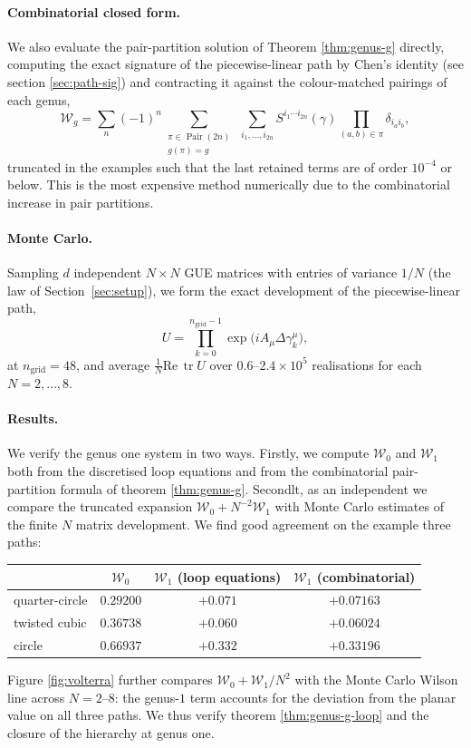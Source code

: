 \documentclass[11pt,a4paper]{article}
\DeclareMathOperator{\tr}{tr}
\DeclareMathOperator{\Pair}{Pair}
\newcommand{\cW}{\mathcal{W}}
\begin{document}
\paragraph{Combinatorial closed form.}
We also evaluate the pair-partition solution of Theorem \ref{thm:genus-g} directly, computing the exact signature of the piecewise-linear path by Chen's identity (see section \ref{sec:path-sig}) and contracting it against the colour-matched pairings of each genus,
\begin{equation}\label{eq:W1-comb}
  \cW_g = \sum_{n}(-1)^n \sum_{\substack{\pi\in\Pair(2n)\\ g(\pi)=g}}\ \sum_{i_1,\dots,i_{2n}} S^{i_1\cdots i_{2n}}(\gamma)\prod_{(a,b)\in\pi}\delta_{i_a i_b},
\end{equation}
truncated in the examples such that the last retained terms are of order $10^{-4}$ or below. This is the most expensive method numerically due to the combinatorial increase in pair partitions.

\paragraph{Monte Carlo.}
Sampling $d$ independent $N\times N$ GUE matrices with entries of variance $1/N$ (the law of Section~\ref{sec:setup}), we form the exact development of the piecewise-linear path,
\begin{equation}\label{eq:euler-prod}
  U = \prod_{k=0}^{n_{\mathrm{grid}}-1}\exp \bigl(iA_\mu\Delta\gamma^\mu_k\bigr),
\end{equation}
at $n_{\mathrm{grid}}=48$, and average $\tfrac{1}{N}\mathrm{Re}\,\tr U$ over $0.6$--$2.4\times10^5$ realisations for each $N=2,\ldots,8$.

\paragraph{Results.}
We verify the genus one system in two ways. Firstly, we
compute $\cW_0$ and $\cW_1$ both from the discretised loop equations and from the combinatorial pair-partition formula of theorem \ref{thm:genus-g}. Secondlt, as an independent
we compare the truncated expansion $\cW_0+N^{-2}\cW_1$ with Monte Carlo estimates of the finite $N$ matrix development. We find good agreement on the example three paths:
\begin{center}
\begin{tabular}{lccc}
 & $\cW_0$ & $\cW_1$ (loop equations) & $\cW_1$ (combinatorial)\\
\hline
quarter-circle & $0.29200$ & $+0.071$ & $+0.07163$\\
twisted cubic  & $0.36738$ & $+0.060$ & $+0.06024$\\
circle         & $0.66937$ & $+0.332$ & $+0.33196$\\
\end{tabular}
\end{center}
Figure \ref{fig:volterra} further compares $\cW_0+\cW_1/N^2$ with the Monte Carlo Wilson line across $N=2$--$8$: the genus-$1$ term accounts for the deviation from the planar value on all three paths. We thus verify theorem \ref{thm:genus-g-loop} and the closure of the hierarchy at genus one.
\end{document}
